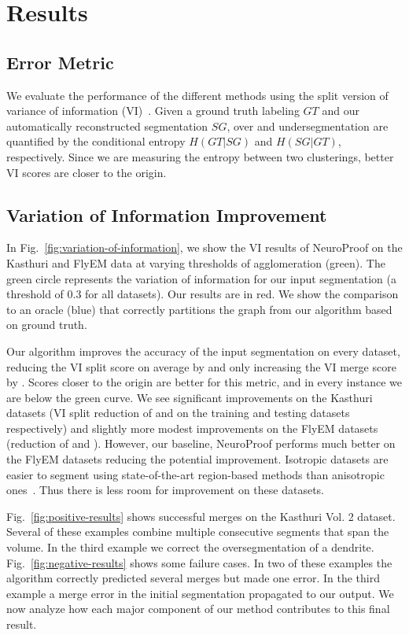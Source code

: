 \section{Results}

\subsection{Error Metric}
\label{sec:variation-of-information}

We evaluate the performance of the different methods using the split version of variance of information (VI)~\cite{meila2003comparing}. 
Given a ground truth labeling $GT$ and our automatically reconstructed segmentation $SG$, over and undersegmentation are quantified by the conditional entropy $H(GT | SG)$ and $H(SG | GT)$, respectively. Since we are measuring the entropy between two clusterings, better VI scores are closer to the origin.

\subsection{Variation of Information Improvement}

In Fig.~\ref{fig:variation-of-information}, we show the VI results of NeuroProof on the Kasthuri and FlyEM data at varying thresholds of agglomeration (green). 
The green circle represents the variation of information for our input segmentation (a threshold of 0.3 for all datasets). 
Our results are in red.  
We show the comparison to an oracle (blue) that correctly partitions the graph from our algorithm based on ground truth. 

Our algorithm improves the accuracy of the input segmentation on every dataset, reducing the VI split score on average by  and only increasing the VI merge score by . 
Scores closer to the origin are better for this metric, and in every instance we are below the green curve. 
We see significant improvements on the Kasthuri datasets (VI split reduction of  and  on the training and testing datasets respectively) and slightly more modest improvements on the FlyEM datasets (reduction of  and ).
However, our baseline, NeuroProof performs much better on the FlyEM datasets reducing the potential improvement. 
Isotropic datasets are easier to segment using state-of-the-art region-based methods than anisotropic ones~\cite{plaza2014annotating}.
Thus there is less room for improvement on these datasets. 

Fig.~\ref{fig:positive-results} shows successful merges on the Kasthuri Vol. 2 dataset. 
Several of these examples combine multiple consecutive segments that span the volume. 
In the third example we correct the oversegmentation of a dendrite.
Fig.~\ref{fig:negative-results} shows some failure cases. 
In two of these examples the algorithm correctly predicted several merges but made one error.
In the third example a merge error in the initial segmentation propagated to our output. 
We now analyze how each major component of our method contributes to this final result.

